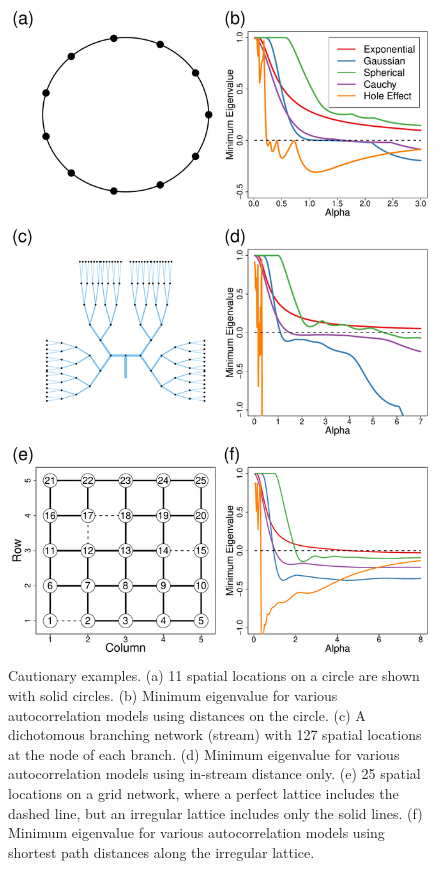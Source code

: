\documentclass[11pt, titlepage]{article}\usepackage[]{graphicx}\usepackage[]{color}
\begin{document}
\begin{spacing}{1.9}
\begin{flushleft}
\begin{singlespace}


	\begin{figure}[H]
	  \begin{center}
	    \includegraphics[width=.7\linewidth]{figure/Fig-CautionEx-1.pdf}
	  \end{center}
	  \caption{Cautionary examples. (a) 11 spatial locations on a circle are shown with solid circles. (b) Minimum eigenvalue for various autocorrelation models using distances on the circle. (c) A dichotomous branching network (stream) with 127 spatial locations at the node of each branch. (d) Minimum eigenvalue for various autocorrelation models using in-stream distance only. (e) 25 spatial locations on a grid network, where a perfect lattice includes the dashed line, but an irregular lattice includes only the solid lines. (f) Minimum eigenvalue for various autocorrelation models using shortest path distances along the irregular lattice. \label{fig:cautionEx}}
  \end{figure}




\end{singlespace}
\end{flushleft}
\end{spacing}
\end{document}
